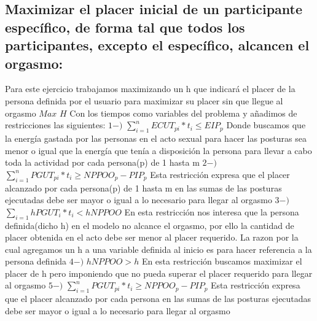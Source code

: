 \documentclass{llncs}
\begin{document}
\subsection{Maximizar el placer inicial de un participante específico, de forma tal que todos los participantes, excepto el específico, alcancen el orgasmo:}
Para este ejercicio trabajamos maximizando un h que indicará el placer de la persona definida por el usuario para maximizar su placer sin que llegue al orgasmo
\newline
\newline
$Max$ $H$
\newline
\newline
Con los tiempos como variables del problema y añadimos de restricciones las siguientes:
\newline
\newline
$1-)$ $\sum_{i = 1}^{n} ECUT_{pi}*t_{i} \leq EIP_{p}$
\newline
\newline
Donde buscamos que la energía gastada por las personas en el acto sexual para hacer las posturas sea menor o igual que la energía que tenía a disposición la persona para llevar a cabo toda la actividad por cada persona(p) de 1 hasta m
\newline
\newline
$2-)$ $\sum_{i = 1}^{n} PGUT_{pi}*t_{i} \geq NPPOO_{p} - PIP_{p}$
\newline
\newline
Esta restricción expresa que el placer alcanzado por cada persona(p) de 1 hasta m en las sumas de las posturas ejecutadas debe ser mayor o igual a lo necesario para llegar al orgasmo
\newline
\newline
$3-)$ $\sum_{i = 1} hPGUT_{i}*t_{i} < hNPPOO$
\newline
\newline
En esta restricción nos interesa que la persona definida(dicho h) en el modelo no alcance el orgasmo, por ello la cantidad de placer obtenida en el acto debe ser menor al placer requerido. La razon por la cual agregamos un h a una variable definida al inicio es para hacer referencia a la persona definida
\newline
\newline
$4-)$ $hNPPOO > h$
\newline
\newline
En esta restricción buscamos maximizar el placer de h pero imponiendo que no pueda superar el placer requerido para llegar al orgasmo
\newline
\newline
$5-)$ $\sum_{i = 1}^{n} PGUT_{pi}*t_{i} \geq NPPOO_{p} - PIP_{p}$
\newline
\newline
Esta restricción expresa que el placer alcanzado por cada persona en las sumas de las posturas ejecutadas debe ser mayor o igual a lo necesario para llegar al orgasmo
\end{document}
